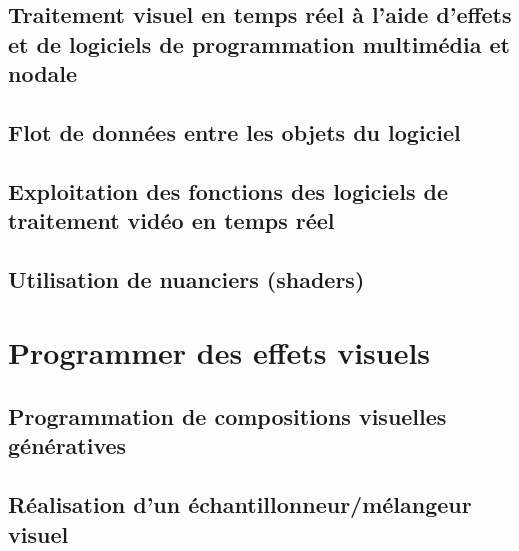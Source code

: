 \documentclass[
]{book}
\begin{document}
\hypertarget{traitement-visuel-en-temps-ruxe9el-uxe0-laide-deffets-et-de-logiciels-de-programmation-multimuxe9dia-et-nodale}{%
\section{Traitement visuel en temps réel à l'aide d'effets et de logiciels de programmation multimédia et nodale}\label{traitement-visuel-en-temps-ruxe9el-uxe0-laide-deffets-et-de-logiciels-de-programmation-multimuxe9dia-et-nodale}}

\hypertarget{flot-de-donnuxe9es-entre-les-objets-du-logiciel}{%
\section{Flot de données entre les objets du logiciel}\label{flot-de-donnuxe9es-entre-les-objets-du-logiciel}}

\hypertarget{exploitation-des-fonctions-des-logiciels-de-traitement-viduxe9o-en-temps-ruxe9el}{%
\section{Exploitation des fonctions des logiciels de traitement vidéo en temps réel}\label{exploitation-des-fonctions-des-logiciels-de-traitement-viduxe9o-en-temps-ruxe9el}}

\hypertarget{utilisation-de-nuanciers-shaders}{%
\section{Utilisation de nuanciers (shaders)}\label{utilisation-de-nuanciers-shaders}}

\hypertarget{programmer}{%
\chapter{Programmer des effets visuels}\label{programmer}}

\hypertarget{programmation-de-compositions-visuelles-guxe9nuxe9ratives}{%
\section{Programmation de compositions visuelles génératives}\label{programmation-de-compositions-visuelles-guxe9nuxe9ratives}}

\hypertarget{ruxe9alisation-dun-uxe9chantillonneurmuxe9langeur-visuel}{%
\section{Réalisation d'un échantillonneur/mélangeur visuel}\label{ruxe9alisation-dun-uxe9chantillonneurmuxe9langeur-visuel}}
\end{document}
